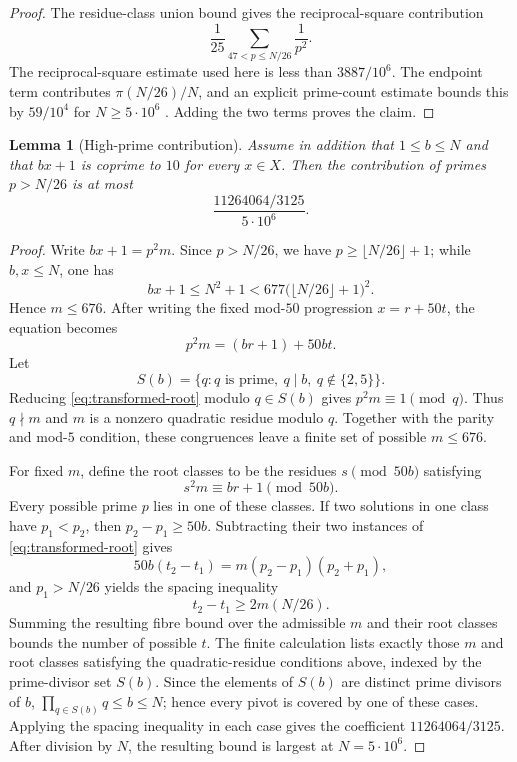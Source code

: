\documentclass[11pt]{article}
\newtheorem{lemma}[theorem]{Lemma}
\theoremstyle{definition}
\newcommand{\FiveMillion}{5\cdot10^6}
\begin{document}
\begin{proof}
The residue-class union bound gives the reciprocal-square contribution
\[
 \frac1{25}\sum_{47<p\leq N/26}\frac1{p^2}.
\]
The reciprocal-square estimate used here is less than $3887/10^6$.  The
endpoint term contributes $\pi(N/26)/N$, and an explicit prime-count estimate bounds
this by $59/10^4$ for $N\geq\FiveMillion$
\cite{RosserSchoenfeld,DusartPrimes}.  Adding the two terms proves the claim.
\end{proof}

\begin{lemma}[High-prime contribution]\label{lem:pure-global-high}
Assume in addition that $1\leq b\leq N$ and that $bx+1$ is coprime to $10$
for every $x\in X$.  Then the contribution of primes $p>N/26$ is at most
\[
 \frac{11264064/3125}{\FiveMillion}.
\]
\end{lemma}

\begin{proof}
Write $bx+1=p^2m$.  Since $p>N/26$, we have
$p\geq\lfloor N/26\rfloor+1$; while $b,x\leq N$, one has
\[
 bx+1\leq N^2+1
 <677\bigl(\lfloor N/26\rfloor+1\bigr)^2.
\]
Hence $m\leq676$.  After writing the fixed mod-$50$ progression
$x=r+50t$, the equation becomes
\begin{equation}\label{eq:transformed-root}
 p^2m=(br+1)+50bt.
\end{equation}
Let
\[
 S(b)=\{q:q\text{ is prime},\ q\mid b,\ q\notin\{2,5\}\}.
\]
Reducing \eqref{eq:transformed-root} modulo $q\in S(b)$ gives
$p^2m\equiv1\pmod q$.  Thus $q\nmid m$ and $m$ is a nonzero quadratic
residue modulo $q$.  Together with the parity and mod-$5$ condition, these
congruences leave a finite set of possible $m\leq676$.

For fixed $m$, define the root classes to be the residues $s\pmod {50b}$
satisfying
\[
 s^2m\equiv br+1\pmod {50b}.
\]
Every possible prime $p$ lies in one of these classes.  If two solutions in
one class have $p_1<p_2$, then $p_2-p_1\geq50b$.  Subtracting their two
instances of \eqref{eq:transformed-root} gives
\[
 50b(t_2-t_1)=m(p_2-p_1)(p_2+p_1),
\]
and $p_1>N/26$ yields the spacing inequality
\[
 t_2-t_1\geq 2m(N/26).
\]
 Summing the resulting fibre bound over the admissible $m$ and their root
 classes bounds the number of possible $t$.  The finite calculation lists
 exactly those $m$ and root classes satisfying the quadratic-residue
 conditions above, indexed by the prime-divisor set $S(b)$.
 Since the elements of $S(b)$ are distinct prime divisors of $b$,
 $\prod_{q\in S(b)}q\leq b\leq N$; hence every pivot is covered by one of
 these cases.  Applying the spacing inequality in each case gives the
 coefficient $11264064/3125$.  After division by $N$, the resulting bound is
 largest at $N=\FiveMillion$.
\end{proof}
\end{document}
